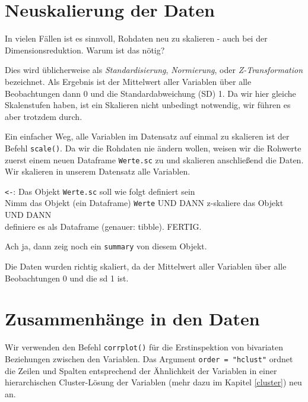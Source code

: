 \documentclass[12pt,ngerman,]{book}
\makeatletter
\newenvironment{Shaded}{\begin{snugshade}}{\end{snugshade}}
\newcommand{\KeywordTok}[1]{\textcolor[rgb]{0.13,0.29,0.53}{\textbf{{#1}}}}
\newcommand{\StringTok}[1]{\textcolor[rgb]{0.31,0.60,0.02}{{#1}}}
\newcommand{\NormalTok}[1]{{#1}}
\newenvironment{kframe}{%
\medskip{}
\setlength{\fboxsep}{.8em}
 \def\at@end@of@kframe{}%
 \ifinner\ifhmode%
  \def\at@end@of@kframe{\end{minipage}}%
  \begin{minipage}{\columnwidth}%
 \fi\fi%
 \def\FrameCommand##1{\hskip\@totalleftmargin \hskip-\fboxsep
 \colorbox{shadecolor}{##1}\hskip-\fboxsep
     \hskip-\linewidth \hskip-\@totalleftmargin \hskip\columnwidth}%
 \MakeFramed {\advance\hsize-\width
   \@totalleftmargin\z@ \linewidth\hsize
   \@setminipage}}%
 {\par\unskip\endMakeFramed%
 \at@end@of@kframe}
\renewenvironment{Shaded}{\begin{kframe}}{\end{kframe}}
\theoremstyle{definition}
\theoremstyle{definition}
\theoremstyle{remark}
\let\BeginKnitrBlock\begin \let\EndKnitrBlock\end
\makeatother
\begin{document}
\section{Neuskalierung der Daten}\label{neuskalierung-der-daten}

In vielen Fällen ist es sinnvoll, Rohdaten neu zu skalieren - auch bei
der Dimensionsreduktion. Warum ist das nötig?

Dies wird üblicherweise als \emph{Standardisierung}, \emph{Normierung},
oder \emph{Z-Transformation} bezeichnet. Als Ergebnis ist der Mittelwert
aller Variablen über alle Beobachtungen dann 0 und die
Standardabweichung (SD) 1. Da wir hier gleiche Skalenstufen haben, ist
ein Skalieren nicht unbedingt notwendig, wir führen es aber trotzdem
durch.

Ein einfacher Weg, alle Variablen im Datensatz auf einmal zu skalieren
ist der Befehl \texttt{scale()}. Da wir die Rohdaten nie ändern wollen,
weisen wir die Rohwerte zuerst einem neuen Dataframe \texttt{Werte.sc}
zu und skalieren anschließend die Daten. Wir skalieren in unserem
Datensatz alle Variablen.

\begin{Shaded}
\end{Shaded}

\BeginKnitrBlock{rmdpseudocode}
\texttt{\textless{}-}: Das Objekt \texttt{Werte.sc} soll wie folgt
definiert sein\\
Nimm das Objekt (ein Dataframe) \texttt{Werte} UND DANN z-skaliere das
Objekt UND DANN\\
definiere es als Dataframe (genauer: tibble). FERTIG.

Ach ja, dann zeig noch ein \texttt{summary} von diesem Objekt.
\EndKnitrBlock{rmdpseudocode}

Die Daten wurden richtig skaliert, da der Mittelwert aller Variablen
über alle Beobachtungen 0 und die sd 1 ist.

\section{Zusammenhänge in den Daten}\label{zusammenhange-in-den-daten}

Wir verwenden den Befehl \texttt{corrplot()} für die Erstinspektion von
bivariaten Beziehungen zwischen den Variablen. Das Argument
\texttt{order\ =\ "hclust"} ordnet die Zeilen und Spalten entsprechend
der Ähnlichkeit der Variablen in einer hierarchischen Cluster-Lösung der
Variablen (mehr dazu im Kapitel \ref{cluster}) neu an.
\end{document}
